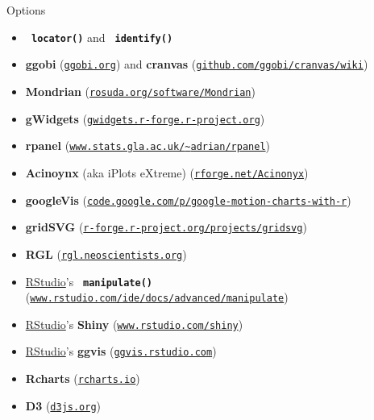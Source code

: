 \documentclass[final,plain]{beamer}
\newlength{\sepwid}
\newlength{\onecolwid}
\newcommand{\bi}{\begin{itemize}}
\newcommand{\ei}{\end{itemize}}
\newcommand{\ttsm}{\tt \small}
\newcommand{\bluebold}{\color{dblue} \bf}
\begin{document}
\begin{frame}[t]
\begin{columns}[t]
\begin{column}{\onecolwid}
  \end{column}

  \begin{column}{\sepwid} \end{column} %

  \begin{column}{\onecolwid}

    \begin{block}{Options}{

      \bi \itemsep18pt
      \item {\tt \bluebold locator()} and {\tt \bluebold identify()}
      \item {\bluebold ggobi} {\small (\href{http://ggobi.org}{\ttsm ggobi.org})} and
        {\bluebold cranvas}
        {\small (\href{https://github.com/ggobi/cranvas/wiki}{\ttsm github.com/ggobi/cranvas/wiki})}
      \item {\bluebold Mondrian}
        {\small (\href{http://rosuda.org/software/Mondrian/}{\ttsm rosuda.org/software/Mondrian})}
      \item {\bluebold gWidgets}
        {\small (\href{http://gwidgets.r-forge.r-project.org/}{\ttsm gwidgets.r-forge.r-project.org})}
      \item {\bluebold rpanel}
        {\small (\href{http://www.stats.gla.ac.uk/~adrian/rpanel/}{\ttsm www.stats.gla.ac.uk/{\textasciitilde}adrian/rpanel})}
      \item {\bluebold Acinoynx} (aka iPlots eXtreme)
        {\small (\href{http://rforge.net/Acinonyx/}{\ttsm rforge.net/Acinonyx})}
      \item {\bluebold googleVis}
        {\small (\href{https://code.google.com/p/google-motion-charts-with-r/}{\ttsm code.google.com/p/google-motion-charts-with-r})}
      \item {\bluebold gridSVG}
        {\small (\href{http://r-forge.r-project.org/projects/gridsvg/}{\ttsm r-forge.r-project.org/projects/gridsvg})}
      \item {\bluebold RGL}
        {\small (\href{http://rgl.neoscientists.org/}{\ttsm rgl.neoscientists.org})}
      \item \href{http://www.rstudio.com}{RStudio}'s {\tt \bluebold manipulate()} 
        {\small (\href{http://www.rstudio.com/ide/docs/advanced/manipulate}{\ttsm www.rstudio.com/ide/docs/advanced/manipulate})}
      \item \href{http://www.rstudio.com}{RStudio}'s {\bluebold Shiny}
        {\small (\href{http://www.rstudio.com/shiny}{\ttsm www.rstudio.com/shiny})}
      \item \href{http://www.rstudio.com}{RStudio}'s {\bluebold ggvis}
        {\small (\href{http://ggvis.rstudio.com}{\ttsm ggvis.rstudio.com})}
      \item {\bluebold Rcharts}
        {\small (\href{http://rcharts.io}{\ttsm rcharts.io})}
      \item {\bluebold D3} {\small (\href{http://d3js.org}{\ttsm d3js.org})}
      \ei

}
\end{block}
\end{column}
\end{columns}
\end{frame}
\end{document}
